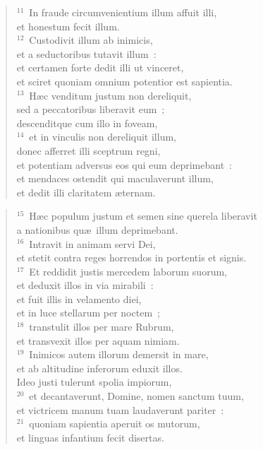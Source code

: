 \begin{flushleft}
\begin{verse}
${}^{11}$~In fraude circumvenientium illum affuit illi,\\ et honestum fecit illum.\\
${}^{12}$~Custodivit illum ab inimicis,\\ et a seductoribus tutavit illum~:\\ et certamen forte dedit illi ut vinceret,\\ et sciret quoniam omnium potentior est sapientia.\\
${}^{13}$~H\ae c venditum justum non dereliquit,\\ sed a peccatoribus liberavit eum~;\\ descenditque cum illo in foveam,\\
${}^{14}$~et in vinculis non dereliquit illum,\\ donec afferret illi sceptrum regni,\\ et potentiam adversus eos qui eum deprimebant~:\\ et mendaces ostendit qui maculaverunt illum,\\ et dedit illi claritatem \ae ternam.\end{verse}\end{flushleft}


\begin{flushleft}\begin{verse}${}^{15}$~H\ae c populum justum et semen sine querela liberavit\\ a nationibus qu\ae\ illum deprimebant.\\
${}^{16}$~Intravit in animam servi Dei,\\ et stetit contra reges horrendos in portentis et signis.\\
${}^{17}$~Et reddidit justis mercedem laborum suorum,\\ et deduxit illos in via mirabili~:\\ et fuit illis in velamento diei,\\ et in luce stellarum per noctem~;\\
${}^{18}$~transtulit illos per mare Rubrum,\\ et transvexit illos per aquam nimiam.\\
${}^{19}$~Inimicos autem illorum demersit in mare,\\ et ab altitudine inferorum eduxit illos.\\ Ideo justi tulerunt spolia impiorum,\\
${}^{20}$~et decantaverunt, Domine, nomen sanctum tuum,\\ et victricem manum tuam laudaverunt pariter~:\\
${}^{21}$~quoniam sapientia aperuit os mutorum,\\ et linguas infantium fecit disertas.\end{verse}\end{flushleft}


